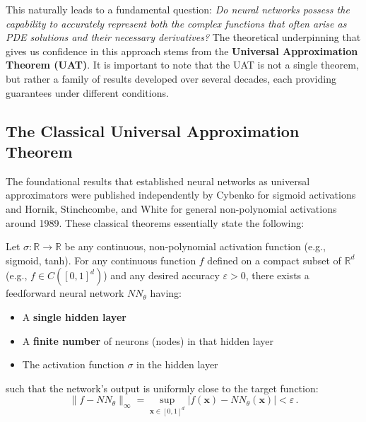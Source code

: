 This naturally leads to a fundamental question: \textit{Do neural networks possess the capability to accurately represent both the complex functions that often arise as PDE solutions and their necessary derivatives?} 
The theoretical underpinning that gives us confidence in this approach stems from the \textbf{Universal Approximation Theorem (UAT)}. 
It is important to note that the UAT is not a single theorem, but rather a family of results developed over several decades, each providing guarantees under different conditions.

\subsection{The Classical Universal Approximation Theorem}

The foundational results that established neural networks as universal approximators were published independently by Cybenko \cite{cybenko1989approximation} for sigmoid activations and Hornik, Stinchcombe, and White \cite{hornik1989multilayer} for general non-polynomial activations around 1989. 
These classical theorems essentially state the following:

\begin{theorem}
    \label{thm:classical_uat}
    Let $\sigma: \mathbb{R} \to \mathbb{R}$ be any continuous, non-polynomial activation function (e.g., sigmoid, tanh). 
    For any continuous function $f$ defined on a compact subset of $\mathbb{R}^d$ (e.g., $f \in C([0,1]^d)$) and any desired accuracy $\varepsilon > 0$, there exists a feedforward neural network $NN_\theta$ having:
    \begin{itemize}
        \item A \textbf{single hidden layer}
        \item A \textbf{finite number} of neurons (nodes) in that hidden layer
        \item The activation function $\sigma$ in the hidden layer
    \end{itemize}
    such that the network's output is uniformly close to the target function:
    \[
        \|f - NN_\theta\|_\infty = \sup_{\mathbf{x} \in [0,1]^d} |f(\mathbf{x}) - NN_\theta(\mathbf{x})| < \varepsilon\,.
    \]
\end{theorem}

